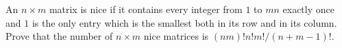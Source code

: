 An $n \times m$ matrix is nice if it contains every integer from $1$ to $mn$ exactly once and $1$ is the only entry which is the smallest both in its row and in its column. Prove that the number of $n \times m$ nice matrices is $(nm)!n!m!/(n+m-1)!$.